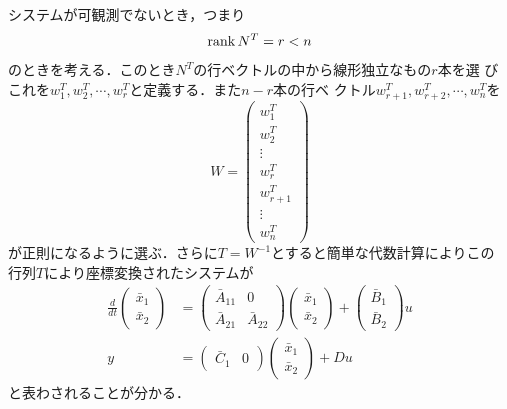 システムが可観測でないとき，つまり
\begin{equation}
 \mathop{\rm rank}\nolimits N^T = r < n
\end{equation}
のときを考える．このとき$N^T$の行ベクトルの中から線形独立なもの$r$本を選
びこれを$w_1^T, w_2^T, \cdots, w_r^T$と定義する．また$n-r$本の行ベ
クトル$w_{r+1}^T, w_{r+2}^T, \cdots, w_n^T$を
\begin{equation}
 W = \left(\begin{array}{c}
            w_1^T \\
	    w_2^T \\
	    \vdots \\
	    w_r^T \\
	    w_{r+1}^T \\
	    \vdots \\
	    w_n^T
	   \end{array}\right)
\end{equation}
が正則になるように選ぶ．さらに$T=W^{-1}$とすると簡単な代数計算によりこの
行列$T$により座標変換されたシステムが
\begin{align}
 \frac{d}{dt}
  \left(\begin{array}{c}
         \bar{x}_1 \\
	 \bar{x}_2 
	\end{array}\right)
  &=
  \left(\begin{array}{cc}
         \bar{A}_{11} & 0 \\
	 \bar{A}_{21} & \bar{A}_{22}
	\end{array}\right)
  \left(\begin{array}{c}
         \bar{x}_1 \\
	 \bar{x}_2 
	\end{array}\right)
  +
  \left(\begin{array}{c}
         \bar{B}_1 \\
	 \bar{B}_2
	\end{array}\right)
  u \\
 y &=
  \left(\begin{array}{cc}
         \bar{C}_1 & 0         
	\end{array}\right)
  \left(\begin{array}{c}
         \bar{x}_1 \\
	 \bar{x}_2 
	\end{array}\right)
  + D u
\end{align}
と表わされることが分かる．

